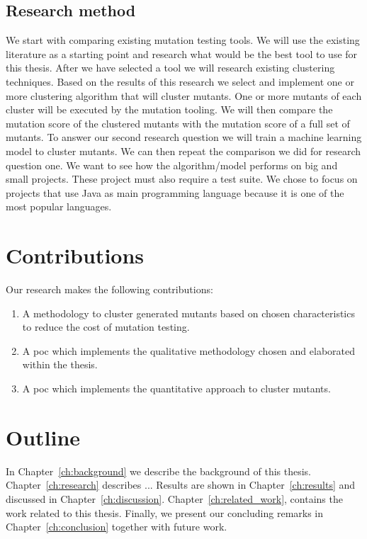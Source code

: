 \documentclass[../main]{subfiles}
\begin{document}
\subsection{Research method}
We start with comparing existing mutation testing tools. 
We will use the existing literature as a starting point and research what would be the best tool to use for this thesis.
\newline
After we have selected a tool we will research existing clustering techniques.
Based on the results of this research we select and implement one or more clustering algorithm that will cluster mutants. 
One or more mutants of each cluster will be executed by the mutation tooling.
We will then compare the mutation score of the clustered mutants with the mutation score of a full set of mutants.
\newline
To answer our second research question we will train a machine learning model to cluster mutants.
We can then repeat the comparison we did for research question one. 
\newline
We want to see how the algorithm/model performs on big and small projects.
These project must also require a test suite.
\newline
We chose to focus on projects that use Java as main programming language because it is one of the most popular languages\cite{Tiobe}.

\section{Contributions}
Our research makes the following contributions:
\begin{enumerate}
 \item A methodology to cluster generated mutants based on chosen characteristics to reduce the cost of mutation testing.
 \item A \acrfull{poc} which implements the qualitative methodology chosen and elaborated within the thesis.
 \item A \acrfull{poc} which implements the quantitative approach to cluster mutants. 
\end{enumerate}

\section{Outline}
In Chapter~\ref{ch:background} we describe the background of this thesis. 
Chapter~\ref{ch:research} describes ... 
Results are shown in Chapter~\ref{ch:results} and discussed in Chapter~\ref{ch:discussion}. Chapter~\ref{ch:related_work}, contains the work related to this thesis.
Finally, we present our concluding remarks in Chapter~\ref{ch:conclusion} together with future work.
\end{document}

